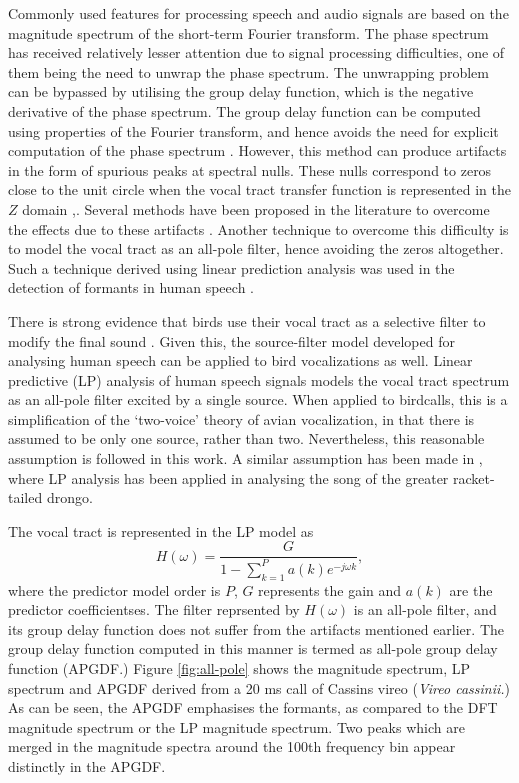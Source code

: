 \documentclass[a4paper]{article}
\begin{document}
Commonly used features for processing speech and audio signals are based on the
magnitude spectrum of the short-term Fourier transform. The phase spectrum has
received relatively lesser attention due to signal processing difficulties, one
of them being the need to unwrap the phase spectrum. The unwrapping problem can
be bypassed by utilising the group delay function, which is the negative
derivative of the phase spectrum. The group delay function can be computed using
properties of the Fourier transform, and hence avoids the need for explicit
computation of the phase spectrum \cite{gdDeriv}.  However, this method can
produce artifacts in the form of spurious peaks at spectral nulls. These nulls
correspond to zeros close to the unit circle when the vocal tract transfer
function is represented in the $Z$ domain \cite{hemaSigProc1989},\cite{chirpGd}.
Several methods have been proposed in the literature to overcome the effects due
to these artifacts \cite{modgdf} \cite{productSpectrum} \cite{chirpGd}. Another
technique to overcome this difficulty is to model the vocal tract as an all-pole
filter, hence avoiding the zeros altogether. Such a technique derived using
linear prediction analysis was used in the detection of formants in human speech
\cite{yegnaFormant}. 

There is strong evidence that birds use their vocal tract as a selective filter
to modify the final sound \cite{catchpole}.  Given this, the source-filter model
developed for analysing human speech can be applied to bird vocalizations as
well.  Linear predictive (LP) analysis of human speech signals models the vocal
tract spectrum as an all-pole filter \cite{makhoul} excited by a single source.
When applied to birdcalls, this is a simplification of the `two-voice' theory of
avian vocalization\cite{catchpole}, in that there is assumed to be only one
source, rather than two. Nevertheless, this reasonable assumption is followed in
this work. A similar assumption has been made in \cite{agnihotri}, where LP
analysis has been applied in analysing the song of the greater racket-tailed
drongo.

The vocal tract is represented in the LP model as
\begin{equation}
H(\omega) = \frac{G}{1-\sum_{k=1}^{P} a(k) e^{-j \omega k}},
\end{equation}
where the predictor model order is $P$, $G$ represents the gain and $a(k)$ are
the predictor coefficientses\cite{makhoul}.
The filter reprsented by $H(\omega)$ is an all-pole filter, and its group delay
function does not suffer from the artifacts mentioned earlier. The group delay
function computed in this manner is termed as all-pole group delay
function (APGDF.) Figure \ref{fig:all-pole} shows the magnitude spectrum, LP
spectrum and APGDF derived from a 20 ms call of Cassins vireo (\textit{Vireo
cassinii.}) As can be seen, the APGDF emphasises the formants, as compared to the
DFT magnitude spectrum or the LP magnitude spectrum. Two peaks which are merged
in the magnitude spectra around the 100th frequency bin appear distinctly in the
APGDF.
\end{document}
